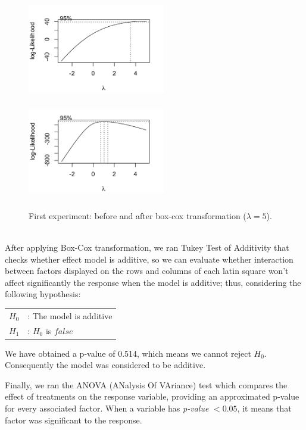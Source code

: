 \begin{figure}
\includegraphics[height=4.5cm, width=6cm]{img/u2.png}
\hfill
\includegraphics[height=4.3cm, width=6cm]{img/u2boxcox.png}
\caption{First experiment: before and after box-cox transformation ($\lambda = 5$).}
\end{figure}
\\

After applying Box-Cox transformation, we ran Tukey Test of Additivity that checks whether effect model is additive, so we can evaluate whether interaction between factors displayed on the rows and columns of each latin square won't affect significantly the response when the model is additive; thus, considering the following hypothesis:

\begin{tabular}{ll}
$H_{0}$ & : The model is additive \\
$H_{1}$ & : $H_{0}$ is $false$ \\
\end{tabular}

We have obtained a p-value of 0.514, which means we cannot reject $H_{0}$. Consequently the model was considered to be additive.

Finally, we ran the ANOVA (ANalysis Of VAriance) test which compares the effect of treatments on the response variable, providing an approximated p-value for every associated factor. When a variable has \emph{p-value} $< 0.05$, it means that factor was significant to the response.

